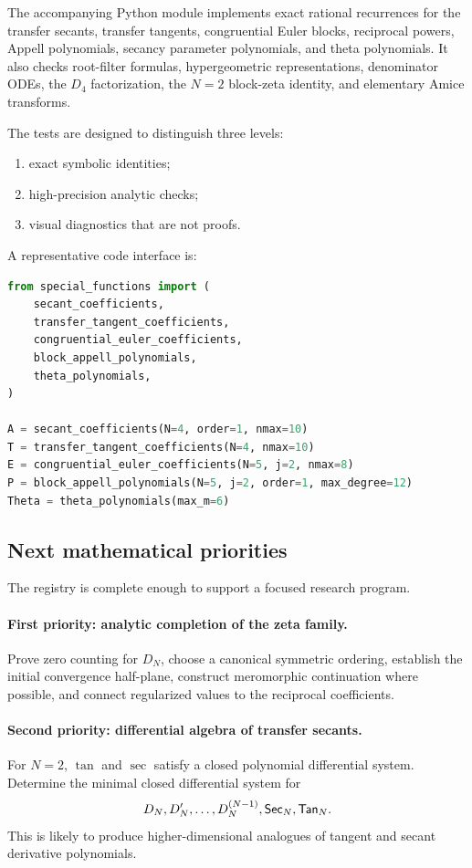 The accompanying Python module implements exact rational recurrences for the transfer secants, transfer tangents, congruential Euler blocks, reciprocal powers, Appell polynomials, secancy parameter polynomials, and theta polynomials.  It also checks root-filter formulas, hypergeometric representations, denominator ODEs, the $D_4$ factorization, the $N=2$ block-zeta identity, and elementary Amice transforms.

The tests are designed to distinguish three levels:
\begin{enumerate}
\item exact symbolic identities;
\item high-precision analytic checks;
\item visual diagnostics that are not proofs.
\end{enumerate}

A representative code interface is:
\begin{lstlisting}[language=Python]
from special_functions import (
    secant_coefficients,
    transfer_tangent_coefficients,
    congruential_euler_coefficients,
    block_appell_polynomials,
    theta_polynomials,
)

A = secant_coefficients(N=4, order=1, nmax=10)
T = transfer_tangent_coefficients(N=4, nmax=10)
E = congruential_euler_coefficients(N=5, j=2, nmax=8)
P = block_appell_polynomials(N=5, j=2, order=1, max_degree=12)
Theta = theta_polynomials(max_m=6)
\end{lstlisting}

\subsection{Next mathematical priorities}

The registry is complete enough to support a focused research program.

\paragraph{First priority: analytic completion of the zeta family.}
Prove zero counting for $D_N$, choose a canonical symmetric ordering, establish the initial convergence half-plane, construct meromorphic continuation where possible, and connect regularized values to the reciprocal coefficients.

\paragraph{Second priority: differential algebra of transfer secants.}
For $N=2$, $\tan$ and $\sec$ satisfy a closed polynomial differential system.  Determine the minimal closed differential system for
\[
D_N,D_N',\ldots,D_N^{(N-1)},\mathsf{Sec}_N,\mathsf{Tan}_N.
\]
This is likely to produce higher-dimensional analogues of tangent and secant derivative polynomials.

